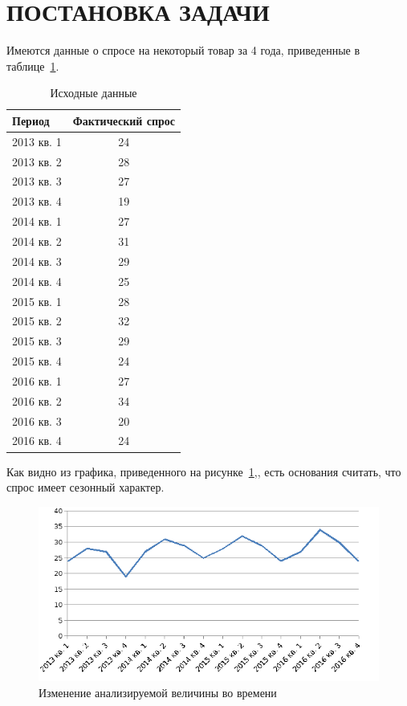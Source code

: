 \section{ПОСТАНОВКА ЗАДАЧИ}

Имеются данные о спросе на некоторый товар за 4 года,
приведенные в таблице~\ref{tbl:source_data}.

\begin{table} [h!]
  \caption{
    Исходные данные
  }\label{tbl:source_data}
    \begin{tabular}{| m{11.4cm} | c |}
      \hline
      Период & Фактический спрос \\ \hline

      2013 кв. 1 & 24 \\ \hline
      2013 кв. 2 & 28 \\ \hline
      2013 кв. 3 & 27 \\ \hline
      2013 кв. 4 & 19 \\ \hline

      2014 кв. 1 & 27 \\ \hline
      2014 кв. 2 & 31 \\ \hline
      2014 кв. 3 & 29 \\ \hline
      2014 кв. 4 & 25 \\ \hline

      2015 кв. 1 & 28 \\ \hline
      2015 кв. 2 & 32 \\ \hline
      2015 кв. 3 & 29 \\ \hline
      2015 кв. 4 & 24 \\ \hline

      2016 кв. 1 & 27 \\ \hline
      2016 кв. 2 & 34 \\ \hline
      2016 кв. 3 & 20 \\ \hline
      2016 кв. 4 & 24 \\ \hline
    \end{tabular}
\end{table}

Как видно из графика, приведенного на рисунке~\ref{fig:source_data},, есть основания считать, что спрос имеет сезонный характер.

\begin{figure}[h!]
  \centering
  \includegraphics[width=150mm]{pic/source_data}
  \caption{Изменение анализируемой величины во времени}
  \label{fig:source_data}
\end{figure}

